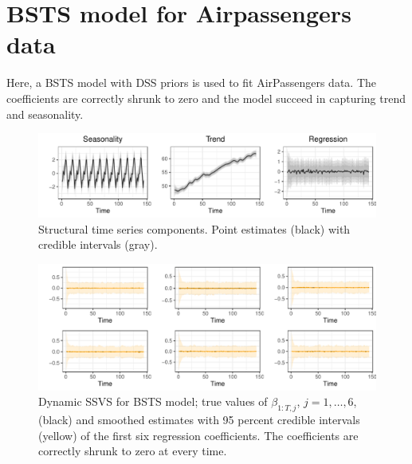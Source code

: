 \documentclass[
  12pt,
]{book}
\theoremstyle{break}
\theoremstyle{nonumberplain}
\begin{document}
\newpage
\section{BSTS model for Airpassengers data}

Here, a BSTS model with DSS priors is used to fit AirPassengers data.
The coefficients are correctly shrunk to zero and the model succeed in
capturing trend and seasonality.

\begin{figure}[H]

{\centering \includegraphics{Dynamic-Shrinkage-in-Bayesian-Structural-Time-Series-and-Vector-Autoregressive-Models_files/figure-latex/unnamed-chunk-11-1} 

}

\caption{Structural time series components. Point estimates (black) with credible intervals (gray).}\label{fig:unnamed-chunk-11}
\end{figure}

\begin{figure}[H]

{\centering \includegraphics{Dynamic-Shrinkage-in-Bayesian-Structural-Time-Series-and-Vector-Autoregressive-Models_files/figure-latex/unnamed-chunk-12-1} 

}

\caption{Dynamic SSVS for BSTS model; true values of $\beta_{1:T, j}$, $j=1, \ldots, 6$, (black) and smoothed estimates with 95 percent credible intervals (yellow) of the first six regression coefficients. The coefficients are correctly shrunk to zero at every time.}\label{fig:unnamed-chunk-12}
\end{figure}
\end{document}
